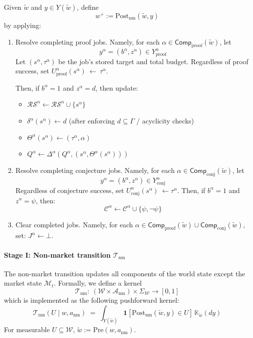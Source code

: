 Given $\tilde w$ and $y\in Y(\tilde w)$, define
\[w^+ := \mathrm{Post}_{\mathrm{nm}}(\tilde w,y)\]
by applying:
\begin{enumerate}
    \item Resolve completing proof jobs. Namely, for each $\alpha\in\mathsf{Comp}_{\mathrm{proof}}(\tilde w)$, let
\[y^\alpha = (b^\alpha, z^\alpha)\in Y^\alpha_{\mathrm{proof}}\]
Let $(s^\alpha,\tau^\alpha)$ be the job’s stored target and total budget. Regardless of proof success, set $U^\alpha_{\mathrm{proof}}(s^\alpha)\ \leftarrow\ \tau^\alpha$.

Then, if $b^\alpha=1$ and $z^\alpha=d$, then update:
\begin{itemize}
    \item	$\mathcal{RS}^\alpha \leftarrow \mathcal{RS}^\alpha \cup \{s^\alpha\}$
	\item	$\delta^\alpha(s^\alpha) \leftarrow d$ (after enforcing $d\subseteq \Gamma$ / acyclicity checks)
	\item	$\Theta^\alpha(s^\alpha)\leftarrow (\tau^\alpha,\alpha)$
	\item	$Q^\alpha \leftarrow \Delta^\alpha(Q^\alpha,(s^\alpha,\Theta^\alpha(s^\alpha)))$
\end{itemize}
	\item Resolve completing conjecture jobs. Namely, for each $\alpha\in\mathsf{Comp}_{\mathrm{conj}}(\tilde w)$, let
\[y^\alpha = (b^\alpha, z^\alpha)\in Y^\alpha_{\mathrm{conj}}\]
Regardless of conjecture success, set $U^\alpha_{\mathrm{conj}}(s^\alpha)\ \leftarrow\tau^\alpha$. Then, if $b^\alpha=1$ and $z^\alpha=\psi$, then:
\[\mathcal C^\alpha \leftarrow \mathcal C^\alpha \cup \{\psi,\neg\psi\}\]
\item Clear completed jobs. Namely, for each $\alpha\in \mathsf{Comp}_{\mathrm{proof}}(\tilde w)\cup \mathsf{Comp}_{\mathrm{conj}}(\tilde w)$, set:
$J^\alpha \leftarrow \bot$.

\end{enumerate}



\paragraph{Stage I: Non-market transition $\mathcal{T}_{\mathrm{nm}}$}

The non-market transition updates all components of the world state except the market state $\mathcal{M}_t$.
Formally, we define a kernel
\[
\mathcal{T}_{\mathrm{nm}}:\ (\mathcal{W}\times \mathcal{A}_{\mathrm{nm}})\times \Sigma_{\mathcal{W}}\to[0,1]
\]
which is implemented as the following pushforward kernel:
\[\mathcal T_{\mathrm{nm}}(U\mid w,a_{\mathrm{nm}})
\;=\;
\int_{Y(\widetilde w)}
\mathbf 1\!\left[\mathrm{Post}_{\mathrm{nm}}(\widetilde w,y)\in U\right]\,
\mathbb K_{\widetilde w}(dy)\]
For measurable $U\subseteq \mathcal W$, $\widetilde w:=\mathrm{Pre}(w,a_{\mathrm{nm}})$.


